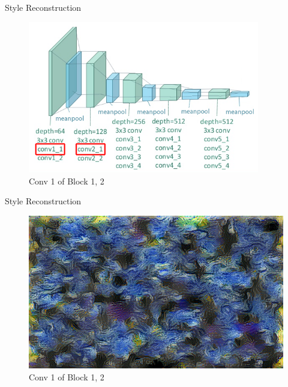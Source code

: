 \documentclass{beamer}
\begin{document}
\begin{frame}{Style Reconstruction}
\begin{figure}[ht]
\centering
\caption*{Conv 1 of Block 1, 2}
\includegraphics[width=0.9\textwidth]{img/vgg19/style/block2_conv1}
\end{figure}
\end{frame}
\begin{frame}{Style Reconstruction}
\begin{figure}[ht]
\centering
\caption*{Conv 1 of Block 1, 2}
\includegraphics[width=\textwidth]{img/style/block2_conv1.png}
\end{figure}
\end{frame}
\end{document}

